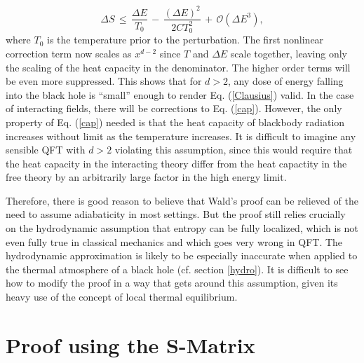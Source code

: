 \documentclass[12pt]{article}
\begin{document}
{\begin{equation}
\Delta S \,\le\, 
\frac{\Delta E}{T_{0}} \,-\, \frac{(\Delta E)^2}{2CT_{0}^2} \,+\, \mathcal{O}(\Delta E^3),
\end{equation}
where $T_{0}$ is the temperature prior to the perturbation.  The first nonlinear correction term now scales as $x^{d-2}$ since $T$ and $\Delta E$ scale together, leaving only the scaling of the heat capacity in the denominator.  The higher order terms will be even more suppressed.  This shows that for $d > 2$, any dose of energy falling into the black hole is ``small'' enough to render Eq. (\ref{Clausius}) valid.  In the case of interacting fields, there will be corrections to Eq. (\ref{cap}).  However, the only property of  Eq. (\ref{cap}) needed is that the heat capacity of blackbody radiation increases without limit as the temperature increases.  It is difficult to imagine any sensible QFT with $d > 2$ violating this assumption, since this would require that the heat capacity in the interacting theory differ from the heat capactity in the free theory by an arbitrarily large factor in the high energy limit.}

Therefore, there is good reason to believe that Wald's proof can be relieved of the need to assume adiabaticity in most settings.  But the proof still relies crucially on the hydrodynamic assumption that entropy can be fully localized, which is not even fully true in classical mechanics and which goes very wrong in QFT.  The hydrodynamic approximation is likely to be especially inaccurate when applied to the thermal atmosphere of a black hole (cf. section \ref{hydro}).  It is difficult to see how to modify the proof in a way that gets around this assumption, given its heavy use of the concept of local thermal equilibrium.

\section{Proof using the S-Matrix}\label{Smat}
\end{document}
